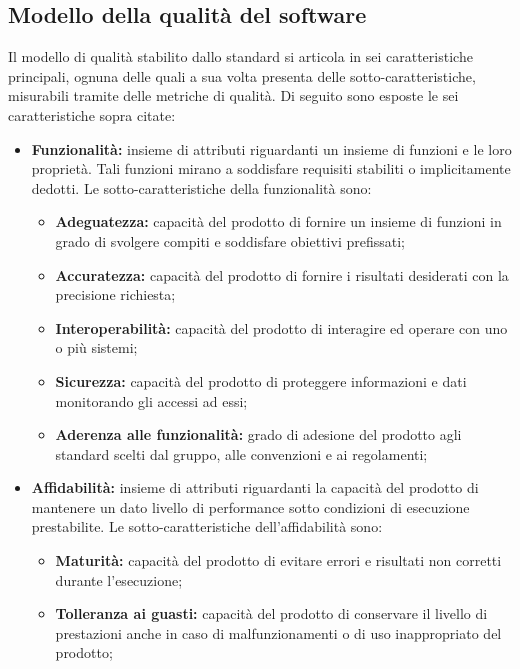 \subsection{Modello della qualità del software} \label{subsection:modello_qualitaSW}
Il modello di qualità stabilito dallo standard si articola in sei caratteristiche principali, ognuna delle quali a sua volta presenta delle sotto-caratteristiche, misurabili tramite delle metriche di qualità.
Di seguito sono esposte le sei caratteristiche sopra citate:
\begin{itemize}
    \item \textbf{Funzionalità:} insieme di attributi riguardanti un insieme di funzioni e le loro proprietà.
          Tali funzioni mirano a soddisfare requisiti stabiliti o implicitamente dedotti.
          Le sotto-caratteristiche della funzionalità sono:
          \begin{itemize}
              \item \textbf{Adeguatezza:} capacità del prodotto di fornire un insieme di funzioni in grado di svolgere compiti e soddisfare obiettivi prefissati;
              \item \textbf{Accuratezza:} capacità del prodotto di fornire i risultati desiderati con la precisione richiesta;
              \item \textbf{Interoperabilità:} capacità del prodotto di interagire ed operare con uno o più sistemi;
              \item \textbf{Sicurezza:} capacità del prodotto di proteggere informazioni e dati monitorando gli accessi ad essi;
              \item \textbf{Aderenza alle funzionalità:} grado di adesione del prodotto agli standard scelti dal gruppo, alle convenzioni e ai regolamenti;
          \end{itemize}
    \item \textbf{Affidabilità:} insieme di attributi riguardanti la capacità del prodotto di mantenere un dato livello di performance sotto condizioni di esecuzione prestabilite.
          Le sotto-caratteristiche dell'affidabilità sono:
          \begin{itemize}
              \item \textbf{Maturità:} capacità del prodotto di evitare errori e risultati non corretti durante l'esecuzione;
              \item \textbf{Tolleranza ai guasti:} capacità del prodotto di conservare il livello di prestazioni anche in caso di malfunzionamenti o di uso inappropriato del prodotto;

\end{itemize}
\end{itemize}
